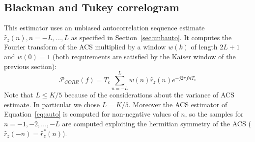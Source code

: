 \documentclass[10pt]{article}
\numberwithin{equation}{section}
\begin{document}
\subsection{Blackman and Tukey correlogram}
This estimator uses an unbiased autocorrelation sequence estimate ${\hat{r}_z(n)}, n = -L, ..., L$ as specified in Section~\ref{sec:unbauto}. It computes the Fourier transform of the ACS multiplied by a window $w(k)$ of length $2L + 1$ and $w(0)=1$ (both requirements are satisfied by the Kaiser window of the previous section):
\begin{equation}
  \mathcal{P}_{CORR}(f) = T_c\sum_{n=-L}^{L}w(n)\hat{r}_z(n)e^{-j2\pi f n T_c}
\end{equation}
Note that $L \le K/5$ because of the considerations about the variance of ACS estimate. In particular we chose $L = K/5$. Moreover the ACS estimator of Equation~\ref{eq:auto} is computed for non-negative values of $n$, so the samples for $n =-1, -2, ..., -L$ are computed exploiting the hermitian symmetry of the ACS ($\hat{r}_z(-n) = \hat{r}_z^*(n)$). \\
\end{document}

